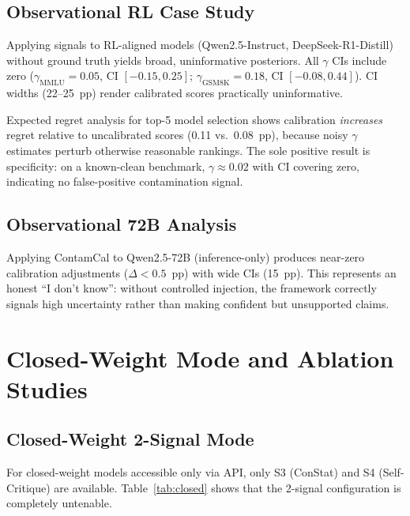 \documentclass[11pt]{article}
\newcommand{\ours}{ContamCal}
\begin{document}
\subsection{Observational RL Case Study}
\label{sec:rl_obs}

Applying signals to RL-aligned models (Qwen2.5-Instruct, DeepSeek-R1-Distill) without ground truth yields broad, uninformative posteriors.
All $\gamma$ CIs include zero ($\gamma_{\text{MMLU}} = 0.05$, CI $[-0.15, 0.25]$; $\gamma_{\text{GSM8K}} = 0.18$, CI $[-0.08, 0.44]$).
CI widths (22--25~pp) render calibrated scores practically uninformative.

Expected regret analysis for top-5 model selection shows calibration \emph{increases} regret relative to uncalibrated scores (0.11 vs.\ 0.08~pp), because noisy $\gamma$ estimates perturb otherwise reasonable rankings.
The sole positive result is specificity: on a known-clean benchmark, $\gamma \approx 0.02$ with CI covering zero, indicating no false-positive contamination signal.

\subsection{Observational 72B Analysis}

Applying \ours{} to Qwen2.5-72B (inference-only) produces near-zero calibration adjustments ($\Delta < 0.5$~pp) with wide CIs (15~pp).
This represents an honest ``I don't know'': without controlled injection, the framework correctly signals high uncertainty rather than making confident but unsupported claims.


\section{Closed-Weight Mode and Ablation Studies}

\subsection{Closed-Weight 2-Signal Mode}
\label{sec:closed}

For closed-weight models accessible only via API, only S3 (ConStat) and S4 (Self-Critique) are available.
Table~\ref{tab:closed} shows that the 2-signal configuration is completely untenable.
\end{document}
